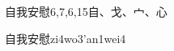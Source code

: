 \begin{entry}{自我安慰}{6,7,6,15}{⾃、⼽、⼧、⼼}
  \begin{phonetics}{自我安慰}{zi4wo3'an1wei4}
  \end{phonetics}
\end{entry}
